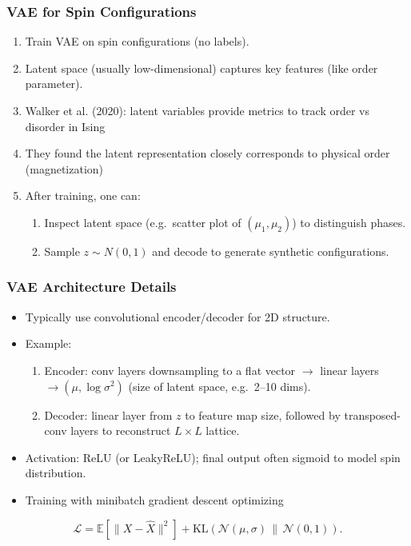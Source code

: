 \documentclass{beamer}
\begin{document}
\begin{frame}
\frametitle{VAE for Spin Configurations}

\begin{enumerate}
\item Train VAE on spin configurations (no labels).

\item Latent space (usually low-dimensional) captures key features (like order parameter).

\item Walker et al. (2020): latent variables provide metrics to track order vs disorder in Ising 

\item They found the latent representation closely corresponds to physical order (magnetization) 

\item After training, one can:
\begin{enumerate}

 \item Inspect latent space (e.g.\ scatter plot of $(\mu_1,\mu_2)$) to distinguish phases.

 \item Sample $z\sim N(0,1)$ and decode to generate synthetic configurations.
\end{enumerate}

\noindent
\end{enumerate}

\noindent
\end{frame}

\begin{frame}
\frametitle{VAE Architecture Details}

\begin{itemize}
\item Typically use convolutional encoder/decoder for 2D structure.

\item Example:
\begin{enumerate}

 \item Encoder: conv layers downsampling to a flat vector $\rightarrow$ linear layers $\rightarrow (\mu, \log\sigma^2)$ (size of latent space, e.g.\ 2–10 dims).

 \item Decoder: linear layer from $z$ to feature map size, followed by transposed-conv layers to reconstruct $L\times L$ lattice.

\end{enumerate}

\noindent
\item Activation: ReLU (or LeakyReLU); final output often sigmoid to model spin distribution.

\item Training with minibatch gradient descent optimizing
\end{itemize}

\noindent
     \[
       \mathcal{L} = \mathbb{E}[\|X - \hat{X}\|^2] +
       \mathrm{KL}(\mathcal{N}(\mu,\sigma)\,\|\,\mathcal{N}(0,1)).
     \]
\end{frame}
\end{document}
